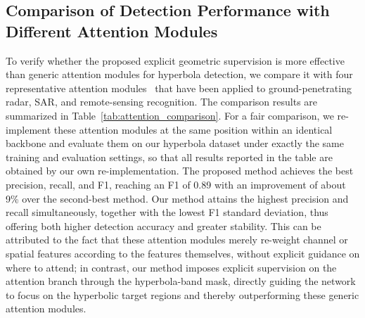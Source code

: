 \documentclass[lettersize,journal]{IEEEtran}
\begin{document}
\subsection{Comparison of Detection Performance with Different Attention Modules}
To verify whether the proposed explicit geometric supervision is more effective than
generic attention modules for hyperbola detection, we compare it with four representative
attention modules~\cite{SE,CBAM,Non-local,CA} that have been applied to ground-penetrating radar,
SAR, and remote-sensing recognition. The comparison results are summarized in Table~\ref{tab:attention_comparison}.
For a fair comparison, we re-implement these attention modules at the same position within an identical backbone 
and evaluate them on our hyperbola dataset under exactly the same training and evaluation settings, 
so that all results reported in the table are obtained by our own re-implementation. 
The proposed method achieves the best precision, recall, and F1, 
reaching an F1 of 0.89 with an improvement of about 9\% over the second-best method. 
Our method attains the highest precision and recall simultaneously,
together with the lowest F1 standard deviation, thus offering both higher detection accuracy and greater stability. 
This can be attributed to the fact that these attention modules merely re-weight channel or spatial features
according to the features themselves, without explicit guidance on where to attend; in contrast,
our method imposes explicit supervision on the attention branch through the hyperbola-band mask, 
directly guiding the network to focus on the hyperbolic target regions and 
thereby outperforming these generic attention modules.
\end{document}
